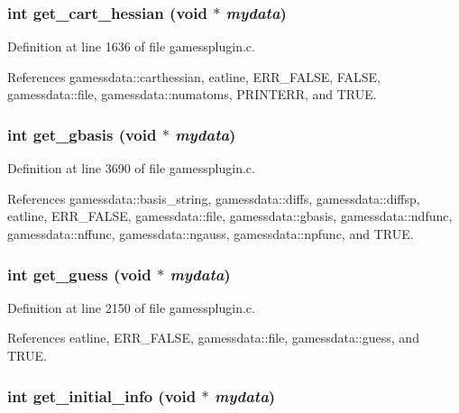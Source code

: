 \subsubsection{\setlength{\rightskip}{0pt plus 5cm}int get\_\-cart\_\-hessian (void $\ast$ {\em mydata})}\label{gamessplugin_8c_a19}




Definition at line 1636 of file gamessplugin.c.

References gamessdata::carthessian, eatline, ERR\_\-FALSE, FALSE, gamessdata::file, gamessdata::numatoms, PRINTERR, and TRUE.
\subsubsection{\setlength{\rightskip}{0pt plus 5cm}int get\_\-gbasis (void $\ast$ {\em mydata})\hspace{0.3cm}{\tt  [static]}}\label{gamessplugin_8c_a33}




Definition at line 3690 of file gamessplugin.c.

References gamessdata::basis\_\-string, gamessdata::diffs, gamessdata::diffsp, eatline, ERR\_\-FALSE, gamessdata::file, gamessdata::gbasis, gamessdata::ndfunc, gamessdata::nffunc, gamessdata::ngauss, gamessdata::npfunc, and TRUE.
\subsubsection{\setlength{\rightskip}{0pt plus 5cm}int get\_\-guess (void $\ast$ {\em mydata})}\label{gamessplugin_8c_a21}




Definition at line 2150 of file gamessplugin.c.

References eatline, ERR\_\-FALSE, gamessdata::file, gamessdata::guess, and TRUE.
\subsubsection{\setlength{\rightskip}{0pt plus 5cm}int get\_\-initial\_\-info (void $\ast$ {\em mydata})}\label{gamessplugin_8c_a15}




